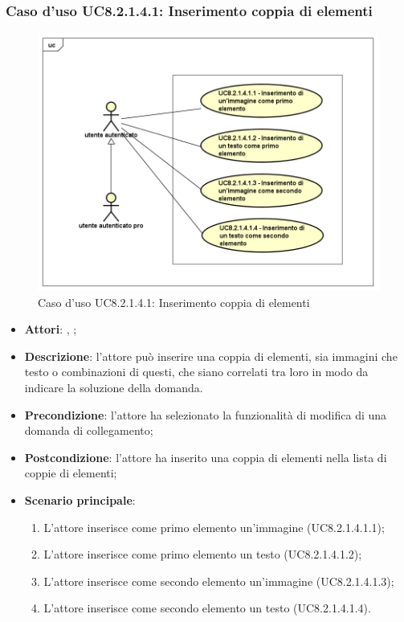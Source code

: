 	\subsubsection{Caso d'uso UC8.2.1.4.1: Inserimento coppia di elementi}
	\label{UC8.2.1.4.1}
	\begin{figure}[h]
		\centering
		\includegraphics[scale=0.5,keepaspectratio]{UML/UC8_2_1_4_1.png}
		\caption{Caso d'uso UC8.2.1.4.1: Inserimento coppia di elementi}
	\end{figure}
	\FloatBarrier
	\begin{itemize}
		\item \textbf{Attori}: \uau, \uaupro;
		\item \textbf{Descrizione}: l'attore può inserire una coppia di elementi, sia immagini che testo o combinazioni di questi, che siano correlati tra loro in modo da indicare la soluzione della domanda. 
		\item \textbf{Precondizione}: l'attore ha selezionato la funzionalità di modifica di una domanda di collegamento;
		\item \textbf{Postcondizione}: l'attore ha inserito una coppia di elementi nella lista di coppie di elementi; 
		\item \textbf{Scenario principale}: 
		\begin{enumerate}
			\item L'attore inserisce come primo elemento un'immagine (UC8.2.1.4.1.1);
			\item L'attore inserisce come primo elemento un testo (UC8.2.1.4.1.2);
			\item L'attore inserisce come secondo elemento un'immagine (UC8.2.1.4.1.3);
			\item L'attore inserisce come secondo elemento un testo (UC8.2.1.4.1.4).	
		\end{enumerate}
	\end{itemize}
	

